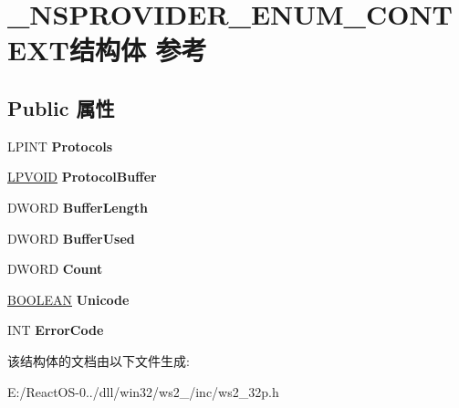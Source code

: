 \hypertarget{struct___n_s_p_r_o_v_i_d_e_r___e_n_u_m___c_o_n_t_e_x_t}{}\section{\+\_\+\+N\+S\+P\+R\+O\+V\+I\+D\+E\+R\+\_\+\+E\+N\+U\+M\+\_\+\+C\+O\+N\+T\+E\+X\+T结构体 参考}
\label{struct___n_s_p_r_o_v_i_d_e_r___e_n_u_m___c_o_n_t_e_x_t}
\subsection*{Public 属性}
\begin{DoxyCompactItemize}
\item 
\mbox{\label{struct___n_s_p_r_o_v_i_d_e_r___e_n_u_m___c_o_n_t_e_x_t_a8dcca233edeee405a275c551420bc5eb}} 
L\+P\+I\+NT {\bfseries Protocols}
\item 
\mbox{\label{struct___n_s_p_r_o_v_i_d_e_r___e_n_u_m___c_o_n_t_e_x_t_a549f462611474ce5f65a11a96dfcf6fb}} 
\hyperlink{interfacevoid}{L\+P\+V\+O\+ID} {\bfseries Protocol\+Buffer}
\item 
\mbox{\label{struct___n_s_p_r_o_v_i_d_e_r___e_n_u_m___c_o_n_t_e_x_t_a5d8162530ea97ac4194f712dfba5899a}} 
D\+W\+O\+RD {\bfseries Buffer\+Length}
\item 
\mbox{\label{struct___n_s_p_r_o_v_i_d_e_r___e_n_u_m___c_o_n_t_e_x_t_a301afcc7d2d5e33125b501536f8a038e}} 
D\+W\+O\+RD {\bfseries Buffer\+Used}
\item 
\mbox{\label{struct___n_s_p_r_o_v_i_d_e_r___e_n_u_m___c_o_n_t_e_x_t_aa079e02abc0db14c251d18ba02024b21}} 
D\+W\+O\+RD {\bfseries Count}
\item 
\mbox{\label{struct___n_s_p_r_o_v_i_d_e_r___e_n_u_m___c_o_n_t_e_x_t_af25051319774d0e0f1a1f0083c86db42}} 
\hyperlink{_processor_bind_8h_a112e3146cb38b6ee95e64d85842e380a}{B\+O\+O\+L\+E\+AN} {\bfseries Unicode}
\item 
\mbox{\label{struct___n_s_p_r_o_v_i_d_e_r___e_n_u_m___c_o_n_t_e_x_t_a7b6db4e127b1cba3c71825c570a18dbb}} 
I\+NT {\bfseries Error\+Code}
\end{DoxyCompactItemize}


该结构体的文档由以下文件生成\+:\begin{DoxyCompactItemize}
\item 
E\+:/\+React\+O\+S-\/0../dll/win32/ws2\+\_/inc/ws2\+\_\+32p.\+h\end{DoxyCompactItemize}
